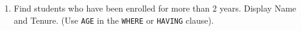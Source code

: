 \documentclass[12pt,a4paper]{article}
\begin{document}
\begin{enumerate}




\item Find students who have been enrolled for more than 2 years. Display Name and Tenure. (Use \texttt{AGE} in the \texttt{WHERE} or \texttt{HAVING} clause).



\end{enumerate}
\end{document}
